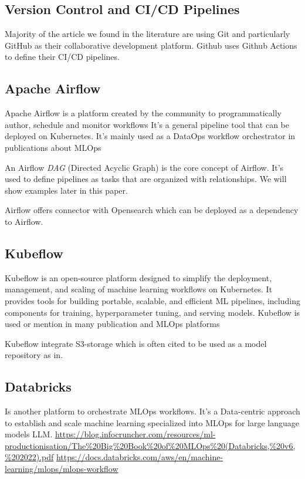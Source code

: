 \subsection{Version Control and CI/CD Pipelines}\label{subsec:version-control-and-ci/cd-pipelines}
Majority of the article we found in the literature are using Git and particularly GitHub\cite{github} as their collaborative development platform.
Github uses Github Actions to define their CI/CD pipelines.

\subsection{Apache Airflow}\label{subsec:apache-airflow}
Apache Airflow\cite{airflow} is a platform created by the community to programmatically author, schedule and monitor workflows\cite{airflow}
It's a general pipeline tool that can be deployed on Kubernetes.
It's mainly used as a DataOps workflow orchestrator in publications about MLOps\cite{???,10245408}

An Airflow \textit{DAG} (Directed Acyclic Graph) is the core concept of Airflow\cite{airflow}.
It's used to define pipelines as tasks that are organized with relationships.
We will show examples later in this paper.

Airflow offers connector with Opensearch which can be deployed as a dependency to Airflow.

\subsection{Kubeflow}\label{subsec:kubeflow2}
Kubeflow\cite{Kubeflow} is an open-source platform designed to simplify the deployment, management, and scaling of machine learning workflows on Kubernetes.
It provides tools for building portable, scalable, and efficient ML pipelines, including components for training, hyperparameter tuning, and serving models.
Kubeflow is used or mention in many publication and MLOps platforms\cite{inproceedings,10855428}

Kubeflow integrate S3-storage which is often cited to be used as a model repository as in\cite{BURGUENOROMERO2025107499}.

\subsection{Databricks}

Is another platform to orchestrate MLOps workflows.
It's a Data-centric approach to establish and scale machine learning specialized into MLOps for large language models LLM.
\url{https://blog.infocruncher.com/resources/ml-productionisation/The%20Big%20Book%20of%20MLOps%20(Databricks,%20v6,%202022).pdf}
\url{https://docs.databricks.com/aws/en/machine-learning/mlops/mlops-workflow}

